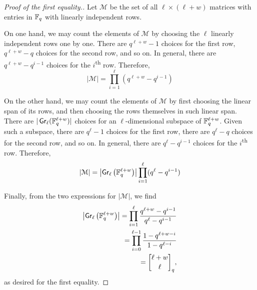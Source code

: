 \begin{proof}[Proof of the first equality.]
    Let \(\mathcal{M}\) be the set of all \(\ell \times (\ell + w)\) matrices with entries in \(\mathbb{F}_{q}\) with linearly independent rows.

    On one hand, we may count the elements of \(\mathcal{M}\) by choosing the \(\ell\) linearly independent rows one by one.
    There are \(q^{\ell + w} - 1\) choices for the first row,
    \(q^{\ell + w} - q\) choices for the second row, and so on.
    In general, there are \(q^{\ell + w} - q^{i-1}\) choices for the \(i\)\textsuperscript{th} row.
    Therefore,
    \begin{equation*}
        \left|
            \mathcal{M}
        \right|
        = \prod_{i=1}^{\ell} (q^{\ell + w} - q^{i-1})
    \end{equation*}

    On the other hand, we may count the elements of \(\mathcal{M}\) by first choosing the linear span of its rows, and then choosing the rows themselves in such linear span.
    There are \(|\operatorname{\mathsf{Gr}}_\ell(\mathbb{F}_{q}^{\ell + w})|\) choices for an \(\ell\)-dimensional subspace of \(\mathbb{F}_{q}^{\ell + w}\).
    Given such a subspace,
    there are \(q^{\ell} - 1\) choices for the first row,
    there are \(q^{\ell} - q\) choices for the second row, and so on.
    In general, there are \(q^{\ell} - q^{i-1}\) choices for the \(i\)\textsuperscript{th} row.
    Therefore,
    \begin{equation*}
        \left|
            \mathcal{M}
        \right|
        = \left|
            \operatorname{\mathsf{Gr}}_\ell\left(\mathbb{F}_{q}^{\ell + w} \right)
        \right|
        \prod_{i=1}^{\ell} (q^{\ell} - q^{i-1})
    \end{equation*}

    Finally, from the two expressions for \(\left| \mathcal{M} \right|\), we find
    \begin{align*}
        \left|
            \Grassmanian_\ell\left(\finitefield{q}^{\ell + w} \right)
        \right|
        = \prod_{i=1}^{\ell} \frac{q^{\ell + w} - q^{i-1}}{q^{\ell} - q^{i-1}} \\
        = \prod_{i=0}^{\ell - 1} \frac{1 - q^{\ell + w - i}}{1 - q^{\ell - i}} \\
        = \qbinom{\ell + w}{\ell},
    \end{align*}
    as desired for the first equality.
\end{proof}

